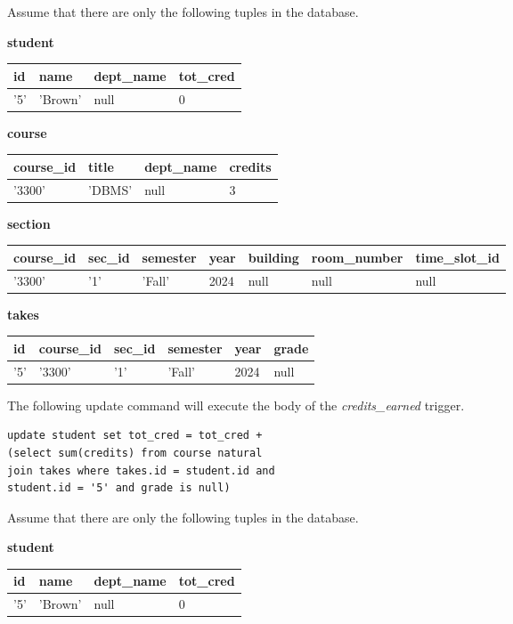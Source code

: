 \documentclass[12pt, addpoints, answers]{exam}
\begin{document}
\begin{questions}
\begin{samepage}
\begin{checkboxes}
\choice Assume that there are only the following tuples in the database.

\textbf{student}

\begin{tabular}{|l|l|l|l|}
\hline
id & name & dept\_name & tot\_cred \\
\hline
'5' & 'Brown' & null & 0 \\
\hline
\end{tabular}

\textbf{course}

\begin{tabular}{|l|l|l|l|}
\hline
course\_id & title & dept\_name & credits \\
\hline
'3300' & 'DBMS' & null & 3 \\
\hline
\end{tabular}

\textbf{section}

\begin{tabular}{|l|l|l|l|l|l|l|}
\hline
course\_id & sec\_id & semester & year & building & room\_number & time\_slot\_id \\
\hline
'3300' & '1' & 'Fall' & 2024 & null & null & null \\
\hline
\end{tabular}

\textbf{takes}

\begin{tabular}{|l|l|l|l|l|l|}
\hline
id & course\_id & sec\_id & semester & year & grade \\
\hline
'5' & '3300' & '1' & 'Fall' & 2024 & null \\
\hline
\end{tabular}

The following update command will execute the body of the \textit{credits\_earned} trigger.
\begin{verbatim}
update student set tot_cred = tot_cred + 
(select sum(credits) from course natural 
join takes where takes.id = student.id and 
student.id = '5' and grade is null)
\end{verbatim}
\choice Assume that there are only the following tuples in the database.

\textbf{student}

\begin{tabular}{|l|l|l|l|}
\hline
id & name & dept\_name & tot\_cred \\
\hline
'5' & 'Brown' & null & 0 \\
\hline
\end{tabular}


\end{checkboxes}
\end{samepage}
\end{questions}
\end{document}
